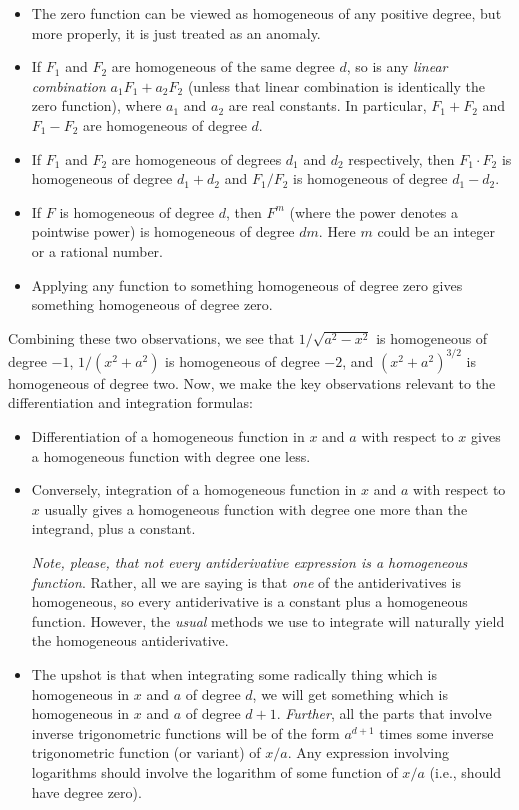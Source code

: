 \documentclass[10pt]{amsart}
\begin{document}
\begin{itemize}
\item The zero function can be viewed as homogeneous of any positive
degree, but more properly, it is just treated as an anomaly.
\item If $F_1$ and $F_2$ are homogeneous of the same degree $d$, so is
  any {\em linear combination} $a_1F_1 +a_2F_2$ (unless that linear
  combination is identically the zero function), where $a_1$ and $a_2$
  are real constants. In particular, $F_1 + F_2$ and $F_1 - F_2$ are
  homogeneous of degree $d$.
\item If $F_1$ and $F_2$ are homogeneous of degrees $d_1$ and $d_2$
  respectively, then $F_1 \cdot F_2$ is homogeneous of degree $d_1 +
  d_2$ and $F_1/F_2$ is homogeneous of degree $d_1 - d_2$.
\item If $F$ is homogeneous of degree $d$, then $F^m$ (where the power
  denotes a pointwise power) is homogeneous of degree $dm$. Here $m$
  could be an integer or a rational number.
\item Applying any function to something homogeneous of degree zero
  gives something homogeneous of degree zero.
\end{itemize}

Combining these two observations, we see that $1/\sqrt{a^2 - x^2}$ is
homogeneous of degree $-1$, $1/(x^2 + a^2)$ is homogeneous of degree
$-2$, and $(x^2 + a^2)^{3/2}$ is homogeneous of degree two. Now, we
make the key observations relevant to the differentiation and
integration formulas:

\begin{itemize}
\item Differentiation of a homogeneous function in $x$ and $a$ with
  respect to $x$ gives a homogeneous function with degree one less.
\item Conversely, integration of a homogeneous function in $x$ and $a$
  with respect to $x$ usually gives a homogeneous function with degree
  one more than the integrand, plus a constant.

  {\em Note, please, that not every antiderivative expression is a
  homogeneous function}. Rather, all we are saying is that {\em one}
  of the antiderivatives is homogeneous, so every antiderivative is a
  constant plus a homogeneous function. However, the {\em usual}
  methods we use to integrate will naturally yield the homogeneous
  antiderivative.
\item The upshot is that when integrating some radically thing which
  is homogeneous in $x$ and $a$ of degree $d$, we will get something
  which is homogeneous in $x$ and $a$ of degree $d + 1$. {\em
  Further}, all the parts that involve inverse trigonometric functions
  will be of the form $a^{d+1}$ times some inverse trigonometric
  function (or variant) of $x/a$. Any expression involving logarithms
  should involve the logarithm of some function of $x/a$ (i.e., should
  have degree zero).
\end{itemize}
\end{document}

